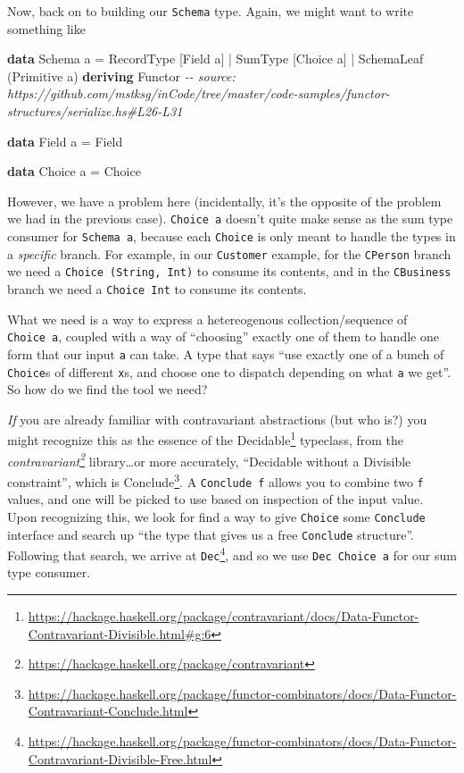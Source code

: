 \documentclass[]{article}
\newenvironment{Shaded}{}{}
\newcommand{\CommentTok}[1]{\textcolor[rgb]{0.38,0.63,0.69}{\textit{#1}}}
\newcommand{\DataTypeTok}[1]{\textcolor[rgb]{0.56,0.13,0.00}{#1}}
\newcommand{\KeywordTok}[1]{\textcolor[rgb]{0.00,0.44,0.13}{\textbf{#1}}}
\newcommand{\NormalTok}[1]{#1}
\newcommand{\OperatorTok}[1]{\textcolor[rgb]{0.40,0.40,0.40}{#1}}
\newcommand{\OtherTok}[1]{\textcolor[rgb]{0.00,0.44,0.13}{#1}}
\renewcommand{\href}[2]{#2\footnote{\url{#1}}}
\begin{document}
Now, back on to building our \texttt{Schema} type. Again, we might want to write
something like

\begin{Shaded}
\begin{Highlighting}[]
\KeywordTok{data} \DataTypeTok{Schema}\NormalTok{ a }\OtherTok{=}
      \DataTypeTok{RecordType}\NormalTok{  [}\DataTypeTok{Field}\NormalTok{ a]}
    \OperatorTok{|} \DataTypeTok{SumType}\NormalTok{     [}\DataTypeTok{Choice}\NormalTok{ a]}
    \OperatorTok{|} \DataTypeTok{SchemaLeaf}\NormalTok{  (}\DataTypeTok{Primitive}\NormalTok{ a)}
  \KeywordTok{deriving} \DataTypeTok{Functor}
\CommentTok{{-}{-} source: https://github.com/mstksg/inCode/tree/master/code{-}samples/functor{-}structures/serialize.hs\#L26{-}L31}

\KeywordTok{data} \DataTypeTok{Field}\NormalTok{ a }\OtherTok{=} \DataTypeTok{Field}

\KeywordTok{data} \DataTypeTok{Choice}\NormalTok{ a }\OtherTok{=} \DataTypeTok{Choice}
\end{Highlighting}
\end{Shaded}

However, we have a problem here (incidentally, it's the opposite of the problem
we had in the previous case). \texttt{Choice\ a} doesn't quite make sense as the
sum type consumer for \texttt{Schema\ a}, because each \texttt{Choice} is only
meant to handle the types in a \emph{specific} branch. For example, in our
\texttt{Customer} example, for the \texttt{CPerson} branch we need a
\texttt{Choice\ (String,\ Int)} to consume its contents, and in the
\texttt{CBusiness} branch we need a \texttt{Choice\ Int} to consume its
contents.

What we need is a way to express a hetereogenous collection/sequence of
\texttt{Choice\ a}, coupled with a way of ``choosing'' exactly one of them to
handle one form that our input \texttt{a} can take. A type that says ``use
exactly one of a bunch of \texttt{Choice}s of different \texttt{x}s, and choose
one to dispatch depending on what \texttt{a} we get''. So how do we find the
tool we need?

\emph{If} you are already familiar with contravariant abstractions (but who is?)
you might recognize this as the essence of the
\href{https://hackage.haskell.org/package/contravariant/docs/Data-Functor-Contravariant-Divisible.html\#g:6}{Decidable}
typeclass, from the
\emph{\href{https://hackage.haskell.org/package/contravariant}{contravariant}}
library\ldots or more accurately, ``Decidable without a Divisible constraint'',
which is
\href{https://hackage.haskell.org/package/functor-combinators/docs/Data-Functor-Contravariant-Conclude.html}{Conclude}.
A \texttt{Conclude\ f} allows you to combine two \texttt{f} values, and one will
be picked to use based on inspection of the input value. Upon recognizing this,
we look for find a way to give \texttt{Choice} some \texttt{Conclude} interface
and search up ``the type that gives us a free \texttt{Conclude} structure''.
Following that search, we arrive at
\href{https://hackage.haskell.org/package/functor-combinators/docs/Data-Functor-Contravariant-Divisible-Free.html}{\texttt{Dec}},
and so we use \texttt{Dec\ Choice\ a} for our sum type consumer.
\end{document}
